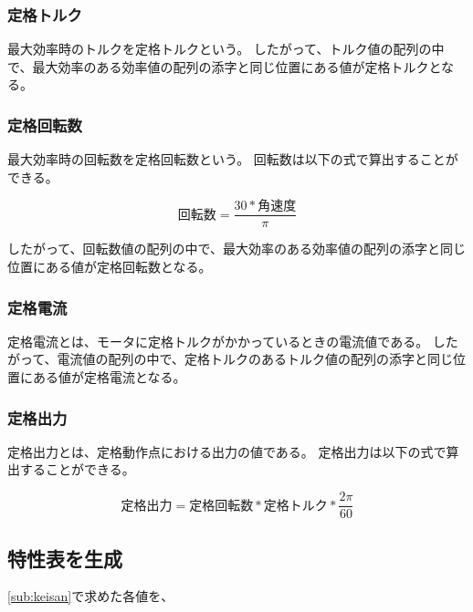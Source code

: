 
\subsubsection{定格トルク}\label{sub:sub:teikakutoruku}
最大効率時のトルクを定格トルクという。
したがって、トルク値の配列の中で、最大効率のある効率値の配列の添字と同じ位置にある値が定格トルクとなる。



\subsubsection{定格回転数}\label{sub:sub:teikakukaiten}
最大効率時の回転数を定格回転数という。
回転数は以下の式で算出することができる。

\[
    \mbox{回転数} = \frac{30 * \mbox{角速度}}{\pi}   
\]

したがって、回転数値の配列の中で、最大効率のある効率値の配列の添字と同じ位置にある値が定格回転数となる。


\subsubsection{定格電流}\label{sub:sub:teikakuden}
定格電流とは、モータに定格トルクがかかっているときの電流値である。
したがって、電流値の配列の中で、定格トルクのあるトルク値の配列の添字と同じ位置にある値が定格電流となる。


\subsubsection{定格出力}\label{sub:sub:teikakusyutu}
定格出力とは、定格動作点における出力の値である。
定格出力は以下の式で算出することができる。

\[
    \mbox{定格出力} = \mbox{定格回転数} * \mbox{定格トルク} *  \frac{2\pi}{60}
\]


\subsection{特性表を生成}\label{sub:seisei_hyou}
\ref{sub:keisan}で求めた各値を、